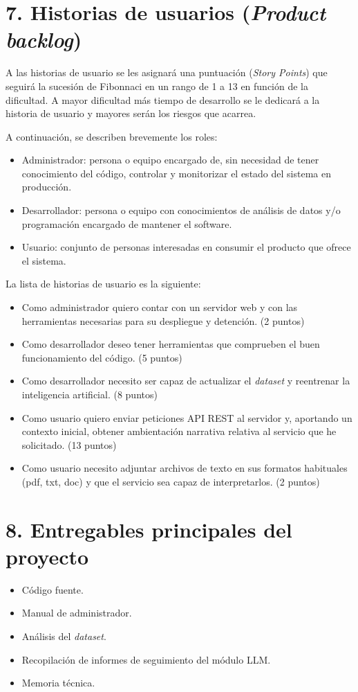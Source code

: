 \documentclass[
11pt, %
]{Clases/charter}
\begin{document}
\section{7. Historias de usuarios (\textit{Product backlog})}
\label{sec:backlog}
A las historias de usuario se les asignará una puntuación (\textit{Story Points}) que seguirá la sucesión de Fibonnaci en un rango de 1 a 13 en función de la dificultad.
A mayor dificultad más tiempo de desarrollo se le dedicará a la historia de usuario y mayores serán los riesgos que acarrea.

A continuación, se describen brevemente los roles:
\begin{itemize}
	\item Administrador: persona o equipo encargado de, sin necesidad de tener conocimiento del código, controlar y monitorizar el estado del sistema en producción.
	\item Desarrollador: persona o equipo con conocimientos de análisis de datos y/o programación encargado de mantener el software.
	\item Usuario: conjunto de personas interesadas en consumir el producto que ofrece el sistema.
\end{itemize}

La lista de historias de usuario es la siguiente:
\begin{itemize}
	\item Como administrador quiero contar con un servidor web y con las herramientas necesarias para su despliegue y detención. (2 puntos)
	\item Como desarrollador deseo tener herramientas que comprueben el buen funcionamiento del código. (5 puntos)
	\item Como desarrollador necesito ser capaz de actualizar el \textit{dataset} y reentrenar la inteligencia artificial. (8 puntos)
	\item Como usuario quiero enviar peticiones API REST al servidor y, aportando un contexto inicial, obtener ambientación narrativa relativa al servicio que he solicitado. (13 puntos)
	\item Como usuario necesito adjuntar archivos de texto en sus formatos habituales (pdf, txt, doc) y que el servicio sea capaz de interpretarlos. (2 puntos)
\end{itemize}


\section{8. Entregables principales del proyecto}
\label{sec:entregables}
\begin{itemize}
	\item Código fuente.
	\item Manual de administrador.
	\item Análisis del \textit{dataset}.
	\item Recopilación de informes de seguimiento del módulo LLM.
	\item Memoria técnica.
\end{itemize}
\end{document}
